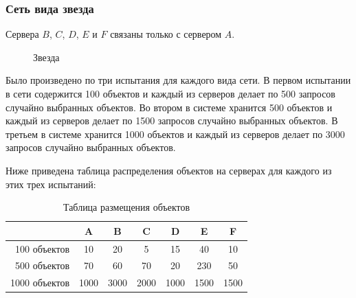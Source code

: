 			\subsubsection{Сеть вида звезда} 
				Сервера $B$, $C$, $D$, $E$ и $F$ связаны только с сервером $A$. 
				\begin{figure}[H] 
					\centering 
					\caption{Звезда} 
				\end{figure} 
		
			Было произведено по три испытания для каждого вида сети. В первом испытании в сети содержится 100 объектов и каждый из серверов делает по 500 запросов случайно выбранных объектов.
			Во втором в системе хранится 500 объектов и каждый из серверов делает по 1500 запросов случайно выбранных объектов. В третьем в системе хранится 1000 объектов и каждый из серверов 
			делает по 3000 запросов случайно выбранных объектов. 
			
			Ниже приведена таблица распределения объектов на серверах для каждого из этих трех испытаний:
		
			\begin{table}[H]
				\small
				\centering
				\caption{Таблица размещения объектов}
				\begin{tabular} {|r|c|c|c|c|c|c|}
					\hline
						& A	    & B      & C      & D      & E     & F      \\
					\hline
	100 объектов		& 10    & 20     & 5      & 15     & 40    & 10     \\
	500 объектов		& 70	& 60	 & 70     & 20     & 230   & 50     \\
	1000 объектов		& 1000  & 3000   & 2000   & 1000   & 1500  & 1500   \\
					\hline
				\end{tabular}
			\end{table}
		
